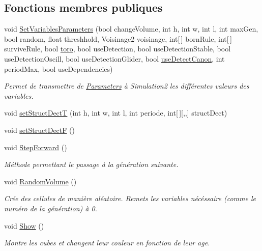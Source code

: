 \subsection*{Fonctions membres publiques}
\begin{DoxyCompactItemize}
\item 
void \mbox{\hyperlink{class_simulation_af1580cd4ce5cb935c5f55ad4ce4f94de}{Set\+Variables\+Parameters}} (bool change\+Volume, int h, int w, int l, int max\+Gen, bool random, float threshhold, Voisinage2 voisinage, int\mbox{[}$\,$\mbox{]} born\+Rule, int\mbox{[}$\,$\mbox{]} survive\+Rule, bool \mbox{\hyperlink{class_simulation_a0d34073239ee6afd6c15327ae9f249bb}{toro}}, bool use\+Detection, bool use\+Detection\+Stable, bool use\+Detection\+Oscill, bool use\+Detection\+Glider, bool \mbox{\hyperlink{class_simulation_a2106f84d6bf1aec6e3d852e4a4432217}{use\+Detect\+Canon}}, int period\+Max, bool use\+Dependencies)
\begin{DoxyCompactList}\small\item\em Permet de transmettre de \mbox{\hyperlink{class_parameters}{Parameters}} à Simulation2 les différentes valeurs des variables. \end{DoxyCompactList}\item 
void \mbox{\hyperlink{class_simulation_a19b96b4354d41349e367d282cc4e88aa}{set\+Struct\+DectT}} (int h, int w, int l, int periode, int\mbox{[}$\,$\mbox{]}\mbox{[},,\mbox{]} struct\+Dect)
\item 
void \mbox{\hyperlink{class_simulation_a93ab4fa0107498061196ce3a051d292d}{set\+Struct\+DectF}} ()
\item 
void \mbox{\hyperlink{class_simulation_a1ba6581d305c2d60d174e0cffd917719}{Step\+Forward}} ()
\begin{DoxyCompactList}\small\item\em Méthode permettant le passage à la génération suivante. \end{DoxyCompactList}\item 
void \mbox{\hyperlink{class_simulation_aff8ad1d9fe429a08bf0d42f52b08b71b}{Random\+Volume}} ()
\begin{DoxyCompactList}\small\item\em Crée des cellules de manière aléatoire. Remets les variables nécéssaire (comme le numéro de la génération) à 0. \end{DoxyCompactList}\item 
void \mbox{\hyperlink{class_simulation_af5fd57d6f657f07bc0fac7085832dc82}{Show}} ()
\begin{DoxyCompactList}\small\item\em Montre les cubes et changent leur couleur en fonction de leur age. \end{DoxyCompactList}\item 

\end{DoxyCompactItemize}

